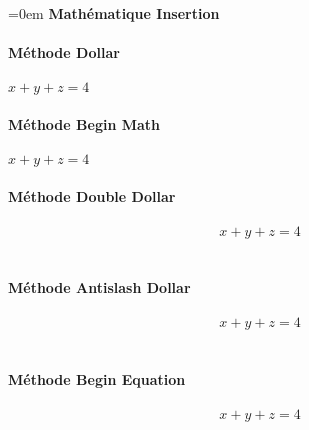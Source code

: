 \documentclass{article}
\begin{document}
\parindent=0em
\textbf{Mathématique Insertion} \\ \\
\textbf{Méthode Dollar} \\ \\
$x+y+z=4$ \\ \\
\textbf{Méthode Begin Math} \\ \\
\begin{math}
x+y+z=4
\end{math} \\ \\
\textbf{Méthode Double Dollar} \\ \\
$${x+y+z=4}$$ \\ \\
\textbf{Méthode Antislash Dollar} \\ \\
\[x+y+z=4\] \\ \\
\textbf{Méthode Begin Equation} \\ \\
\begin{equation}
x+y+z=4
\end{equation}
\end{document}
